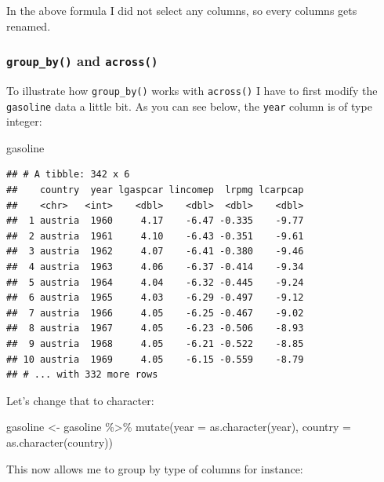 \documentclass[
]{article}
\newenvironment{Shaded}{\begin{snugshade}}{\end{snugshade}}
\newcommand{\AttributeTok}[1]{\textcolor[rgb]{0.77,0.63,0.00}{#1}}
\newcommand{\FunctionTok}[1]{\textcolor[rgb]{0.00,0.00,0.00}{#1}}
\newcommand{\NormalTok}[1]{#1}
\newcommand{\OtherTok}[1]{\textcolor[rgb]{0.56,0.35,0.01}{#1}}
\newcommand{\SpecialCharTok}[1]{\textcolor[rgb]{0.00,0.00,0.00}{#1}}
\begin{document}
In the above formula I did not select any columns, so every columns gets renamed.

\hypertarget{group_by-and-across}{%
\subsubsection{\texorpdfstring{\texttt{group\_by()} and \texttt{across()}}{group\_by() and across()}}\label{group_by-and-across}}

To illustrate how \texttt{group\_by()} works with \texttt{across()} I have to first modify the
\texttt{gasoline} data a little bit. As you can see below, the \texttt{year} column is of type integer:

\begin{Shaded}
\begin{Highlighting}[]
\NormalTok{gasoline}
\end{Highlighting}
\end{Shaded}

\begin{verbatim}
## # A tibble: 342 x 6
##    country  year lgaspcar lincomep  lrpmg lcarpcap
##    <chr>   <int>    <dbl>    <dbl>  <dbl>    <dbl>
##  1 austria  1960     4.17    -6.47 -0.335    -9.77
##  2 austria  1961     4.10    -6.43 -0.351    -9.61
##  3 austria  1962     4.07    -6.41 -0.380    -9.46
##  4 austria  1963     4.06    -6.37 -0.414    -9.34
##  5 austria  1964     4.04    -6.32 -0.445    -9.24
##  6 austria  1965     4.03    -6.29 -0.497    -9.12
##  7 austria  1966     4.05    -6.25 -0.467    -9.02
##  8 austria  1967     4.05    -6.23 -0.506    -8.93
##  9 austria  1968     4.05    -6.21 -0.522    -8.85
## 10 austria  1969     4.05    -6.15 -0.559    -8.79
## # ... with 332 more rows
\end{verbatim}

Let's change that to character:

\begin{Shaded}
\begin{Highlighting}[]
\NormalTok{gasoline }\OtherTok{\textless{}{-}}\NormalTok{ gasoline }\SpecialCharTok{\%\textgreater{}\%}
  \FunctionTok{mutate}\NormalTok{(}\AttributeTok{year =} \FunctionTok{as.character}\NormalTok{(year),}
         \AttributeTok{country =} \FunctionTok{as.character}\NormalTok{(country))}
\end{Highlighting}
\end{Shaded}

This now allows me to group by type of columns for instance:
\end{document}
